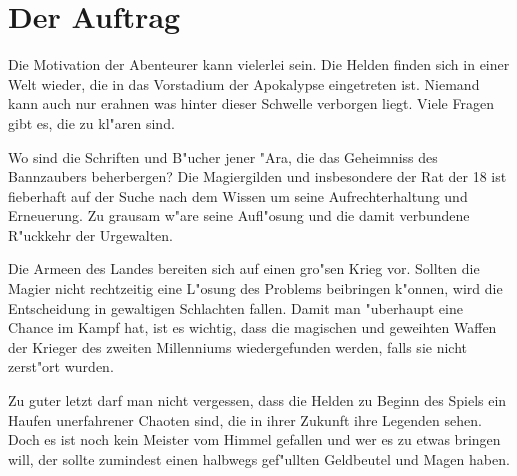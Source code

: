 \section{Der Auftrag}
\par Die Motivation der Abenteurer kann vielerlei sein. Die Helden finden sich in einer Welt
 wieder, die in das Vorstadium der Apokalypse eingetreten ist. Niemand kann auch nur erahnen was hinter dieser
 Schwelle verborgen liegt. Viele Fragen gibt es, die zu kl"aren sind.
\par Wo sind die Schriften und B"ucher jener "Ara, die das Geheimniss des Bannzaubers beherbergen? Die Magiergilden 
und insbesondere der Rat der 18 ist fieberhaft auf der Suche nach dem Wissen um seine Aufrechterhaltung und 
Erneuerung. Zu grausam w"are seine Aufl"osung und die damit verbundene R"uckkehr der Urgewalten.
\par Die Armeen des Landes bereiten sich auf einen gro"sen Krieg vor. Sollten die Magier nicht rechtzeitig eine 
L"osung des Problems beibringen k"onnen, wird die Entscheidung in gewaltigen Schlachten fallen. 
Damit man "uberhaupt eine Chance im Kampf hat, ist es wichtig, dass die magischen und geweihten Waffen der Krieger 
des zweiten Millenniums wiedergefunden werden, falls sie nicht zerst"ort wurden.
\par Zu guter letzt darf man nicht vergessen, dass die Helden zu Beginn des Spiels ein Haufen unerfahrener Chaoten 
sind, die in ihrer Zukunft ihre Legenden sehen. Doch es ist noch kein Meister vom Himmel gefallen und wer es zu 
etwas bringen will, der sollte zumindest einen halbwegs gef"ullten Geldbeutel und Magen haben.
